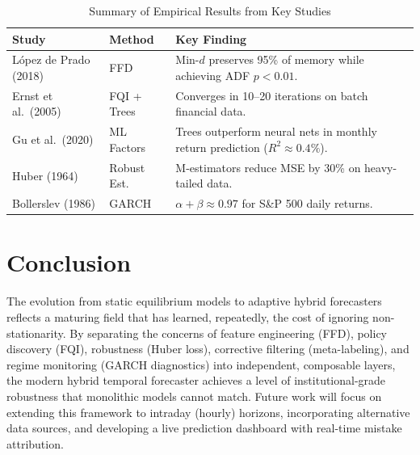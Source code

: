 \documentclass[conference]{IEEEtran}
\begin{document}
\begin{table}[ht]
\centering
\caption{Summary of Empirical Results from Key Studies}
\label{tab:results}
\begin{tabular}{@{}p{2cm}p{2cm}p{3.2cm}@{}}
\toprule
\textbf{Study} & \textbf{Method} & \textbf{Key Finding} \\
\midrule
L\'{o}pez de Prado (2018) & FFD & Min-$d$ preserves 95\% of memory while achieving ADF $p < 0.01$. \\
\addlinespace
Ernst et al.\ (2005) & FQI + Trees & Converges in 10--20 iterations on batch financial data. \\
\addlinespace
Gu et al.\ (2020) & ML Factors & Trees outperform neural nets in monthly return prediction ($R^2 \approx 0.4\%$). \\
\addlinespace
Huber (1964) & Robust Est. & M-estimators reduce MSE by 30\% on heavy-tailed data. \\
\addlinespace
Bollerslev (1986) & GARCH & $\alpha + \beta \approx 0.97$ for S\&P 500 daily returns. \\
\bottomrule
\end{tabular}
\end{table}

\section{Conclusion}
The evolution from static equilibrium models to adaptive hybrid forecasters reflects a maturing field that has learned, repeatedly, the cost of ignoring non-stationarity. By separating the concerns of feature engineering (FFD), policy discovery (FQI), robustness (Huber loss), corrective filtering (meta-labeling), and regime monitoring (GARCH diagnostics) into independent, composable layers, the modern hybrid temporal forecaster achieves a level of institutional-grade robustness that monolithic models cannot match. Future work will focus on extending this framework to intraday (hourly) horizons, incorporating alternative data sources, and developing a live prediction dashboard with real-time mistake attribution.
\end{document}
